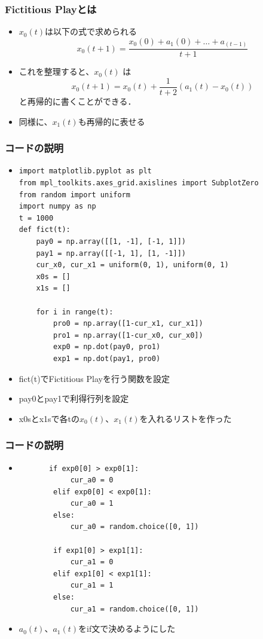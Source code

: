 \documentclass[dvipdfmx,fleqn,jsarticle]{beamer}
\begin{document}
\begin{frame}
\frametitle{Fictitious Playとは}
\begin{itemize}\setlength{\parskip}{0.5em}
\item
$x_0(t)$は以下の式で求められる
\[x_0(t+1) = \frac{x_0(0)+a_1(0)+ \dots +a_(t-1)}{t+1} \]

\item
これを整理すると、$x_0(t)$ は
\[
x_0(t+1)
= x_0(t) + \frac{1}{t+2} (a_1(t) - x_0(t))
\]
と再帰的に書くことができる．


\item
同様に、$x_1(t)$も再帰的に表せる

\end{itemize}
\end{frame}






\begin{frame}[fragile]%
\frametitle{コードの説明}
\begin{itemize}\setlength{\parskip}{0.5em}
\item
\scriptsize
\begin{verbatim}
import matplotlib.pyplot as plt
from mpl_toolkits.axes_grid.axislines import SubplotZero
from random import uniform
import numpy as np
t = 1000
def fict(t):
    pay0 = np.array([[1, -1], [-1, 1]])
    pay1 = np.array([[-1, 1], [1, -1]])
    cur_x0, cur_x1 = uniform(0, 1), uniform(0, 1)
    x0s = []
    x1s = []

    for i in range(t):
        pro0 = np.array([1-cur_x1, cur_x1])
        pro1 = np.array([1-cur_x0, cur_x0])
        exp0 = np.dot(pay0, pro1)
        exp1 = np.dot(pay1, pro0)
\end{verbatim}
\normalsize

\item
fict(t)でFictitious Playを行う関数を設定
\item
pay0とpay1で利得行列を設定
\item
x0sとx1sで各tの$x_0(t)$、$x_1(t)$を入れるリストを作った
\end{itemize}
\end{frame}


\begin{frame}[fragile]%
\frametitle{コードの説明}
\begin{itemize}\setlength{\parskip}{0.5em}
\item
\scriptsize
\begin{verbatim}        
       if exp0[0] > exp0[1]:
            cur_a0 = 0
        elif exp0[0] < exp0[1]:
            cur_a0 = 1
        else:
            cur_a0 = random.choice([0, 1])
	
        if exp1[0] > exp1[1]:
            cur_a1 = 0
        elif exp1[0] < exp1[1]:
            cur_a1 = 1
        else:
            cur_a1 = random.choice([0, 1])
\end{verbatim}
\normalsize

\item
$a_0(t)$、$a_1(t)$をif文で決めるようにした
\end{itemize}
\end{frame}
\end{document}
